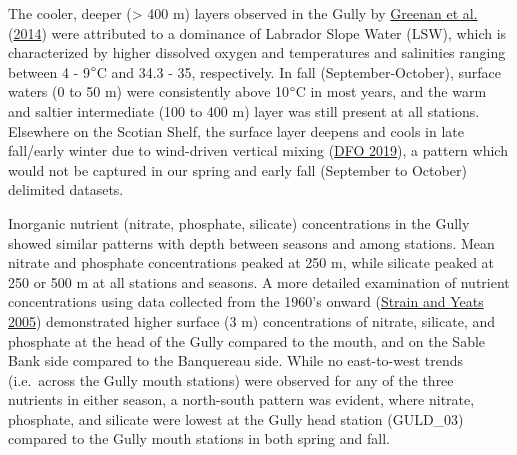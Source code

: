 \documentclass[12pt]{article}\usepackage[]{graphicx}\usepackage[]{color}
\begin{document}
The cooler, deeper (\textgreater{} 400 m) layers observed in the Gully by \protect\hyperlink{ref-greenan_2014}{Greenan et al.} (\protect\hyperlink{ref-greenan_2014}{2014}) were attributed to a dominance of Labrador Slope Water (LSW), which is characterized by higher dissolved oxygen and temperatures and salinities ranging between 4 - 9\(\degree\)C and 34.3 - 35, respectively. In fall (September-October), surface waters (0 to 50 m) were consistently above 10\(\degree\)C in most years, and the warm and saltier intermediate (100 to 400 m) layer was still present at all stations. Elsewhere on the Scotian Shelf, the surface layer deepens and cools in late fall/early winter due to wind-driven vertical mixing (\protect\hyperlink{ref-dfo_2019}{DFO 2019}), a pattern which would not be captured in our spring and early fall (September to October) delimited datasets.

Inorganic nutrient (nitrate, phosphate, silicate) concentrations in the Gully showed similar patterns with depth between seasons and among stations. Mean nitrate and phosphate concentrations peaked at 250 m, while silicate peaked at 250 or 500 m at all stations and seasons. A more detailed examination of nutrient concentrations using data collected from the 1960's onward (\protect\hyperlink{ref-strain_2005}{Strain and Yeats 2005}) demonstrated higher surface (3 m) concentrations of nitrate, silicate, and phosphate at the head of the Gully compared to the mouth, and on the Sable Bank side compared to the Banquereau side. While no east-to-west trends (i.e.~across the Gully mouth stations) were observed for any of the three nutrients in either season, a north-south pattern was evident, where nitrate, phosphate, and silicate were lowest at the Gully head station (GULD\_03) compared to the Gully mouth stations in both spring and fall.
\end{document}
